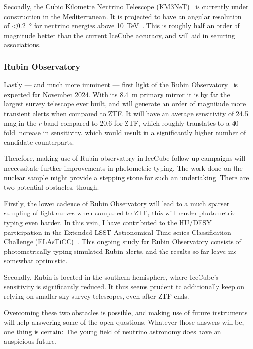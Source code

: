 Secondly, the Cubic Kilometre Neutrino Telescope (KM3NeT)~ is currently under construction in the Mediterranean. It is projected to have an angular resolution of \SI{<0.2}{\degree} for neutrino energies above \SI{10}{\tera\eV}~. This is roughly half an order of magnitude better than the current IceCube accuracy, and will aid in securing associations.

\subsubsection{Rubin Observatory}
Lastly --- and much more imminent --- first light of the Rubin Observatory~\cite{Ivezic2019} is expected for November 2024. With its \SI{8.4}{\m} primary mirror it is by far the largest survey telescope ever built, and will generate an order of magnitude more transient alerts when compared to ZTF. It will have an average sensitivity of 24.5 mag in the \textit{r}-band compared to 20.6 for ZTF, which roughly translates to a 40-fold increase in sensitivity, which would result in a significantly higher number of candidate counterparts.

Therefore, making use of Rubin observatory in IceCube follow up campaigns will neccessitate further improvements in photometric typing. The work done on the nuclear sample might provide a stepping stone for such an undertaking. There are two potential obstacles, though.

Firstly, the lower cadence of Rubin Observatory will lead to a much sparser sampling of light curves when compared to ZTF; this will render photometric typing even harder. In this vein, I have contributed to the HU/DESY participation in the Extended LSST Astronomical Time-series Classification Challenge (ELAsTiCC)~. This ongoing study for Rubin Observatory consists of photometrically typing simulated Rubin alerts, and the results so far leave me somewhat optimistic.

Secondly, Rubin is located in the southern hemisphere, where IceCube's sensitivity is significantly reduced. It thus seems prudent to additionally keep on relying on smaller sky survey telescopes, even after ZTF ends.

Overcoming these two obstacles is possible, and making use of future instruments will help answering some of the open questions. Whatever those answers will be, one thing is certain: The young field of neutrino astronomy does have an auspicious future.